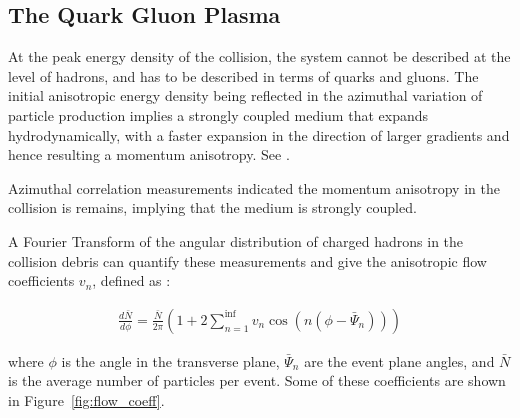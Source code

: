 


\subsection{The Quark Gluon Plasma}
At the peak energy density of the collision, the system cannot be described at the level of hadrons, and has to be described in terms of quarks and gluons. The initial anisotropic energy density being reflected in the azimuthal variation of particle production implies a strongly coupled medium that expands hydrodynamically, with a faster expansion in the direction of larger gradients and hence resulting a momentum anisotropy. See \cite{116, 117, 118, 63}.

Azimuthal correlation measurements \cite{5?, 6?, 90?, 110?, 111?} indicated the momentum anisotropy in the collision is  remains, implying that the medium is strongly coupled. 

A Fourier Transform of the angular distribution of charged hadrons in the collision debris can quantify these measurements and give the anisotropic flow coefficients $v_n$, defined as \cite{115}:

\begin{align}
\frac{d\bar{N}}{d\phi} = \frac{\bar{N}}{2\pi} \left( 1 + 2 \sum_{n=1}^{\inf} v_{n} \cos(n(\phi-\bar{\Psi}_n)) \right)
\end{align}

where $\phi$ is the angle in the transverse plane, $\bar{\Psi}_n$ are the event plane angles, and $\bar{N}$ is the average number of particles per event. Some of these coefficients are shown in Figure~\ref{fig:flow_coeff}.


